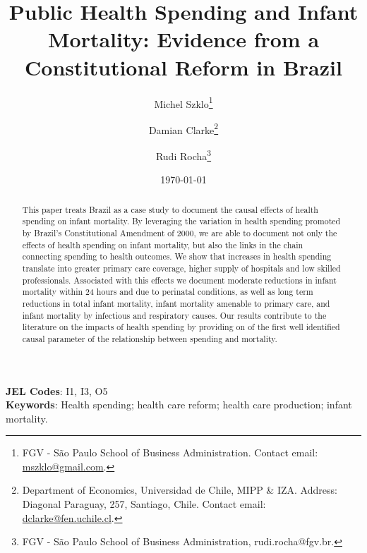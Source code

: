 \documentclass[12pt, final]{article}
\begin{document}
\title{\textbf{Public Health Spending and Infant Mortality: Evidence from a Constitutional Reform in Brazil}}

\author{
\small{Michel Szklo}\footnote{FGV - S\~ao Paulo School of Business Administration. Contact email: \href{mailto:mszklo@gmail.com}{mszklo@gmail.com}.}
\and \small{Damian Clarke}\footnote{Department of Economics, Universidad de Chile, MIPP \& IZA. Address: Diagonal Paraguay, 257, Santiago, Chile.  Contact email: \href{mailto:dclarke@fen.uchile.cl}{dclarke@fen.uchile.cl}.}
\and \small{Rudi Rocha}\footnote{FGV - S\~ao Paulo School of Business Administration, rudi.rocha@fgv.br.}
}
\date{\today}
\maketitle
\begin{center}
\end{center}
\singlespacing
\begin{abstract}
 \noindent This paper treats Brazil as a case study to document the causal effects of health spending on infant mortality. By leveraging the variation in health spending promoted by Brazil's  Constitutional Amendment of 2000, we are able to document not only the effects of health spending on infant mortality, but also the links in the chain connecting spending to health outcomes. We show that increases in health spending translate into greater primary care coverage, higher supply of hospitals and low skilled professionals. Associated with this effects we document moderate reductions in infant mortality within 24 hours and due to perinatal conditions, as well as long term reductions in total infant mortality, infant mortality amenable to primary care, and infant mortality by infectious and respiratory causes.  Our results contribute to the literature on the impacts of health spending by providing on of the first well identified causal parameter of the relationship between spending and mortality.
\end{abstract}

\noindent \textbf{JEL Codes}: I1, I3, O5\\
\noindent \textbf{Keywords}: Health spending; health care reform; health care production; infant mortality.

\newpage
\setcounter{page}{1}










\clearpage
\pagebreak
\singlespacing  


\nocite{}




\pagebreak
\appendix
\singlespacing	

\end{document}
